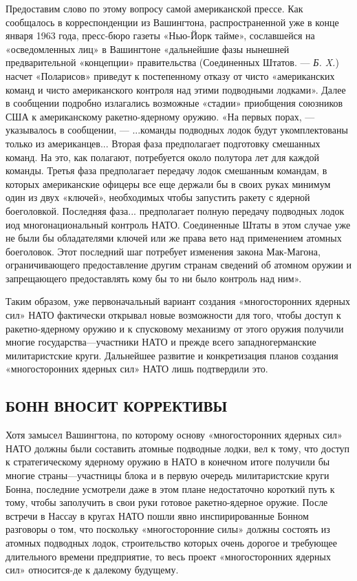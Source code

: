 \documentclass[12pt, a4paper, openany]{book}
\begin{document}
Предоставим слово по этому вопросу самой американской прессе. Как сообщалось в корреспонденции из Вашингтона, распространенной уже в конце января 1963 года, пресс-бюро газеты «Нью-Йорк тайме», сославшейся на «осведомленных лиц» в Вашингтоне «дальнейшие фазы нынешней предварительной «концепции» правительства (Соединенных Штатов. — \textit{Б. X.}) насчет «Поларисов» приведут к постепенному отказу от чисто «американских команд и чисто американского контроля над этими подводными лодками». Далее в сообщении подробно излагались возможные «стадии» приобщения союзников США к американскому ракетно-ядерному оружию. «На первых порах, — указывалось в сообщении, — ...команды подводных лодок будут укомплектованы только из американцев... Вторая фаза предполагает подготовку смешанных команд. На это, как полагают, потребуется около полутора лет для каждой команды. Третья фаза предполагает передачу лодок смешанным командам, в которых американские офицеры все еще держали бы в своих руках минимум один из двух «ключей», необходимых чтобы запустить ракету с ядерной боеголовкой. Последняя фаза... предполагает полную передачу подводных лодок иод многонациональный контроль НАТО. Соединенные Штаты в этом случае уже не были бы обладателями ключей или же права вето над применением атомных боеголовок. Этот последний шаг потребует изменения закона Мак-Магона, ограничивающего предоставление другим странам сведений об атомном оружии и запрещающего предоставлять кому бы то ни было контроль над ним».

Таким образом, уже первоначальный вариант создания «многосторонних ядерных сил» НАТО фактически открывал новые возможности для того, чтобы доступ к ракетно-ядерному оружию и к спусковому механизму от этого оружия получили многие государства—участники НАТО и прежде всего западногерманские милитаристские круги. Дальнейшее развитие и конкретизация планов создания «многосторонних ядерных сил» НАТО лишь подтвердили это.

	\subsection[Бонн вносит коррективы]{\center БОНН ВНОСИТ КОРРЕКТИВЫ}


Хотя замысел Вашингтона, по которому основу «многосторонних ядерных сил» НАТО должны были составить атомные подводные лодки, вел к тому, что доступ к стратегическому ядерному оружию в НАТО в конечном итоге получили бы многие страны—участницы блока и в первую очередь милитаристские круги Бонна, последние усмотрели даже в этом плане недостаточно короткий путь к тому, чтобы заполучить в свои руки готовое ракетно-ядерное оружие. После встречи в Нассау в кругах НАТО пошли явно инспирированные Бонном разговоры о том, что поскольку «многосторонние силы» должны состоять из атомных подводных лодок, строительство которых очень дорогое и требующее длительного времени предприятие, то весь проект «многосторонних ядерных сил» относится-де к далекому будущему.
\end{document}
